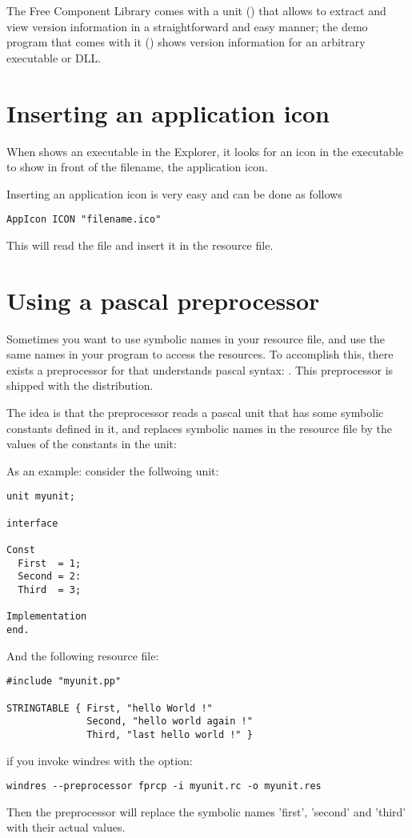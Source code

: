 The Free Component Library comes with a unit () that allows
to extract and view version information in a straightforward and easy manner;
the demo program that comes with it () shows version information
for an arbitrary executable or DLL.

\section{Inserting an application icon}

When \windows shows an executable in the Explorer, it looks for an icon
in the executable to show in front of the filename, the application
icon.

Inserting an application icon is very easy and can be done as follows
\begin{verbatim}
AppIcon ICON "filename.ico"
\end{verbatim}
This will read the file  and insert it in the
resource file.

\section{Using a pascal preprocessor}

Sometimes you want to use symbolic names in your resource file, and
use the same names in your program to access the resources. To accomplish
this, there exists a preprocessor for  that understands pascal
syntax: . This preprocessor is shipped with the \fpc
distribution.

The idea is that the preprocessor reads a pascal unit that has some
symbolic constants defined in it, and replaces symbolic names in the
resource file by the values of the constants in the unit:

As an example: consider the follwoing unit:
\begin{verbatim}
unit myunit;

interface

Const
  First  = 1;
  Second = 2:
  Third  = 3;

Implementation
end.
\end{verbatim}
And the following resource file:
\begin{verbatim}
#include "myunit.pp"

STRINGTABLE { First, "hello World !"
              Second, "hello world again !"
              Third, "last hello world !" }

\end{verbatim}
if you invoke windres with the  option:
\begin{verbatim}
windres --preprocessor fprcp -i myunit.rc -o myunit.res
\end{verbatim}
Then the preprocessor will replace the symbolic names 'first', 'second'
and 'third' with their actual values.

